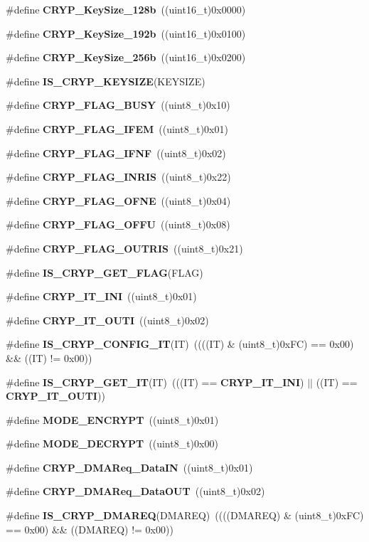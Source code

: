 \begin{DoxyCompactItemize}
\item 
\#define \textbf{ C\+R\+Y\+P\+\_\+\+Key\+Size\+\_\+128b}~((uint16\+\_\+t)0x0000)
\item 
\#define \textbf{ C\+R\+Y\+P\+\_\+\+Key\+Size\+\_\+192b}~((uint16\+\_\+t)0x0100)
\item 
\#define \textbf{ C\+R\+Y\+P\+\_\+\+Key\+Size\+\_\+256b}~((uint16\+\_\+t)0x0200)
\item 
\#define \textbf{ I\+S\+\_\+\+C\+R\+Y\+P\+\_\+\+K\+E\+Y\+S\+I\+ZE}(K\+E\+Y\+S\+I\+ZE)
\item 
\#define \textbf{ C\+R\+Y\+P\+\_\+\+F\+L\+A\+G\+\_\+\+B\+U\+SY}~((uint8\+\_\+t)0x10)
\item 
\#define \textbf{ C\+R\+Y\+P\+\_\+\+F\+L\+A\+G\+\_\+\+I\+F\+EM}~((uint8\+\_\+t)0x01)
\item 
\#define \textbf{ C\+R\+Y\+P\+\_\+\+F\+L\+A\+G\+\_\+\+I\+F\+NF}~((uint8\+\_\+t)0x02)
\item 
\#define \textbf{ C\+R\+Y\+P\+\_\+\+F\+L\+A\+G\+\_\+\+I\+N\+R\+IS}~((uint8\+\_\+t)0x22)
\item 
\#define \textbf{ C\+R\+Y\+P\+\_\+\+F\+L\+A\+G\+\_\+\+O\+F\+NE}~((uint8\+\_\+t)0x04)
\item 
\#define \textbf{ C\+R\+Y\+P\+\_\+\+F\+L\+A\+G\+\_\+\+O\+F\+FU}~((uint8\+\_\+t)0x08)
\item 
\#define \textbf{ C\+R\+Y\+P\+\_\+\+F\+L\+A\+G\+\_\+\+O\+U\+T\+R\+IS}~((uint8\+\_\+t)0x21)
\item 
\#define \textbf{ I\+S\+\_\+\+C\+R\+Y\+P\+\_\+\+G\+E\+T\+\_\+\+F\+L\+AG}(F\+L\+AG)
\item 
\#define \textbf{ C\+R\+Y\+P\+\_\+\+I\+T\+\_\+\+I\+NI}~((uint8\+\_\+t)0x01)
\item 
\#define \textbf{ C\+R\+Y\+P\+\_\+\+I\+T\+\_\+\+O\+U\+TI}~((uint8\+\_\+t)0x02)
\item 
\#define \textbf{ I\+S\+\_\+\+C\+R\+Y\+P\+\_\+\+C\+O\+N\+F\+I\+G\+\_\+\+IT}(IT)~((((IT) \& (uint8\+\_\+t)0x\+F\+C) == 0x00) \&\& ((\+I\+T) != 0x00))
\item 
\#define \textbf{ I\+S\+\_\+\+C\+R\+Y\+P\+\_\+\+G\+E\+T\+\_\+\+IT}(IT)~(((IT) == \textbf{ C\+R\+Y\+P\+\_\+\+I\+T\+\_\+\+I\+NI}) $\vert$$\vert$ ((IT) == \textbf{ C\+R\+Y\+P\+\_\+\+I\+T\+\_\+\+O\+U\+TI}))
\item 
\#define \textbf{ M\+O\+D\+E\+\_\+\+E\+N\+C\+R\+Y\+PT}~((uint8\+\_\+t)0x01)
\item 
\#define \textbf{ M\+O\+D\+E\+\_\+\+D\+E\+C\+R\+Y\+PT}~((uint8\+\_\+t)0x00)
\item 
\#define \textbf{ C\+R\+Y\+P\+\_\+\+D\+M\+A\+Req\+\_\+\+Data\+IN}~((uint8\+\_\+t)0x01)
\item 
\#define \textbf{ C\+R\+Y\+P\+\_\+\+D\+M\+A\+Req\+\_\+\+Data\+O\+UT}~((uint8\+\_\+t)0x02)
\item 
\#define \textbf{ I\+S\+\_\+\+C\+R\+Y\+P\+\_\+\+D\+M\+A\+R\+EQ}(D\+M\+A\+R\+EQ)~((((D\+M\+A\+R\+EQ) \& (uint8\+\_\+t)0x\+F\+C) == 0x00) \&\& ((\+D\+M\+A\+R\+E\+Q) != 0x00))
\end{DoxyCompactItemize}
